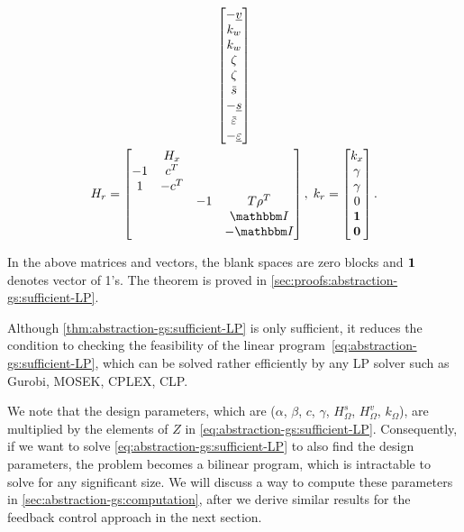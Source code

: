 \begin{theorem}
\begin{gather*}
\begin{bmatrix}
      -\underline{v} \\
      k_{w} \\
      k_{w} \\
      \zeta \\
      \zeta \\
      \overbar{s} \\
      -\underline{s} \\
      \overbar{\varepsilon} \\
      -\underline{\varepsilon}
    \end{bmatrix} \\
    H_{r} =
    \begin{bmatrix}
      & H_{x} \\ %
      -1  & c^{T} \\ %
      1   & -c^{T} \\ %
      & & -1 & T \rho^{T} \\
      & & & \IdentityMatrix \\
      & & & -\IdentityMatrix
    \end{bmatrix}, \;
    k_{r} =
    \begin{bmatrix}
      k_{x} \\
      \gamma \\
      \gamma \\
      0 \\
      \One \\
      \Zero
    \end{bmatrix} \text.
  \end{gather*}
\end{theorem}
In the above matrices and vectors, the blank spaces are zero blocks and $\mathbf{1}$ denotes vector of 1's.
The theorem is proved in \cref{sec:proofs:abstraction-gs:sufficient-LP}.

Although \cref{thm:abstraction-gs:sufficient-LP} is only sufficient, it reduces the condition to checking the feasibility of the linear program~\eqref{eq:abstraction-gs:sufficient-LP}, which can be solved rather efficiently by any LP solver such as Gurobi, MOSEK, CPLEX, CLP.

We note that the design parameters, which are ($\alpha$, $\beta$, $c$, $\gamma$, $H_{\Omega}^{s}$, $H_{\Omega}^{v}$, $k_{\Omega}$), are multiplied by the elements of $Z$ in \eqref{eq:abstraction-gs:sufficient-LP}.
Consequently, if we want to solve \eqref{eq:abstraction-gs:sufficient-LP} to also find the design parameters, the problem becomes a bilinear program, which is intractable to solve for any significant size.
We will discuss a way to compute these parameters in \cref{sec:abstraction-gs:computation}, after we derive similar results for the feedback control approach in the next section.

